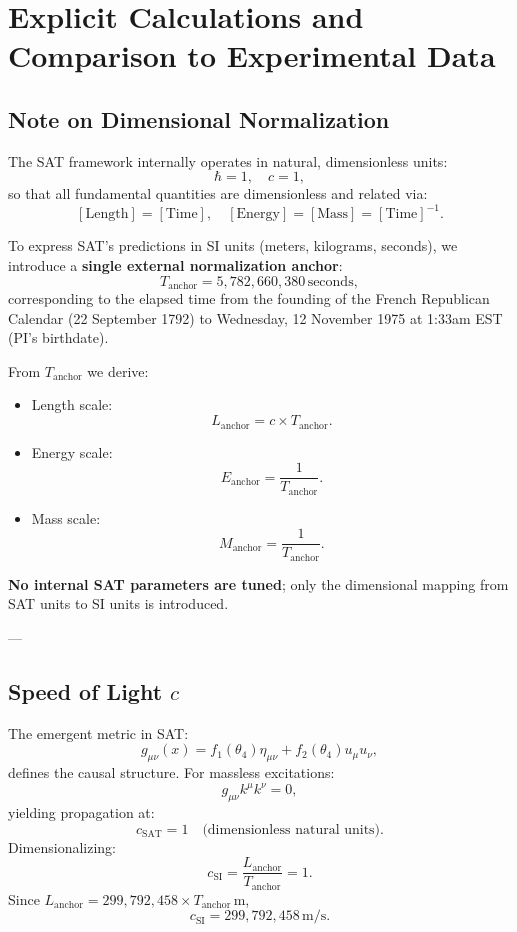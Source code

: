 \documentclass[12pt]{article}
\begin{document}
\newpage
\section{Explicit Calculations and Comparison to Experimental Data}

\subsection*{Note on Dimensional Normalization}

The SAT framework internally operates in natural, dimensionless units:
\[
\hbar = 1, \quad c = 1,
\]
so that all fundamental quantities are dimensionless and related via:
\[
[\text{Length}] = [\text{Time}], \quad [\text{Energy}] = [\text{Mass}] = [\text{Time}]^{-1}.
\]

To express SAT’s predictions in SI units (meters, kilograms, seconds), we introduce a \textbf{single external normalization anchor}:
\[
T_{\text{anchor}} = 5,782,660,380 \, \text{seconds},
\]
corresponding to the elapsed time from the founding of the French Republican Calendar (22 September 1792) to Wednesday, 12 November 1975 at 1:33am EST (PI's birthdate).

From \( T_{\text{anchor}} \) we derive:
\begin{itemize}
    \item Length scale:
    \[
    L_{\text{anchor}} = c \times T_{\text{anchor}}.
    \]
    \item Energy scale:
    \[
    E_{\text{anchor}} = \frac{1}{T_{\text{anchor}}}.
    \]
    \item Mass scale:
    \[
    M_{\text{anchor}} = \frac{1}{T_{\text{anchor}}}.
    \]
\end{itemize}

\textbf{No internal SAT parameters are tuned}; only the dimensional mapping from SAT units to SI units is introduced.

---

\subsection{Speed of Light \( c \)}

The emergent metric in SAT:
\[
g_{\mu\nu}(x) = f_1(\theta_4) \eta_{\mu\nu} + f_2(\theta_4) u_\mu u_\nu,
\]
defines the causal structure. For massless excitations:
\[
g_{\mu\nu} k^\mu k^\nu = 0,
\]
yielding propagation at:
\[
c_{\text{SAT}} = 1 \quad \text{(dimensionless natural units)}.
\]
Dimensionalizing:
\[
c_{\text{SI}} = \frac{L_{\text{anchor}}}{T_{\text{anchor}}} = 1.
\]
Since \( L_{\text{anchor}} = 299,792,458 \times T_{\text{anchor}} \, \text{m} \),
\[
c_{\text{SI}} = 299,792,458 \, \text{m/s}.
\]
\end{document}
